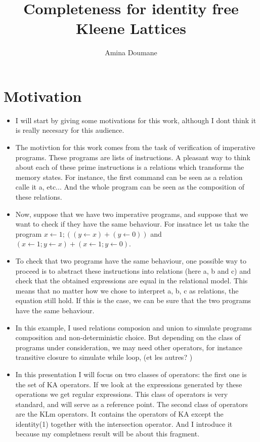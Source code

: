 \documentclass{article}
\title{Completeness for identity free Kleene Lattices }
\author{
  Amina Doumane
}
\begin{document}
\maketitle
\section{Motivation}
\begin{itemize}
\item I will start by giving some motivations for this work, although I dont think it is really necesary for this audience. 
\item  The motivtion for this work comes from the task of verification of imperative programs. These programs are lists of instructions. A pleasant way to think about each of these prime instructions is a relations which transforms the memory states. For instance, the first command can be seen as a relation calle it a, etc... And the whole program can be seen as the composition of these relations.
\item Now, suppose that we have two imperative programs, and suppose that we want to check if they have the same behaviour. For insatnce let us take the program $x \leftarrow 1; ((y \leftarrow x) + (y \leftarrow 0))$ and
$(x \leftarrow 1; y \leftarrow x) + (x \leftarrow 1; y \leftarrow 0)$.

\item To check that two programs have the same behaviour, one possible way to proceed is to abstract these instructions into relations (here a, b and c) and check that the obtained expressions are equal in the relational model. This means that no matter how we chose to interpret a, b, c as relations, the equation still hold. If this is the case, we can be sure that the two programs have the same behaviour.

\item  In this example, I used relations composion and union to simulate programs composition and non-deterministic choice. But depending on the class of programs under consideration, we may need other operators, for instance transitive closure to simulate while loop, (et les autres? ) 

\item In this presentation I will focus on two classes of operators: the first one is the set of KA operators. If we look at the expressions generated by these operations we get regular expressions. This class of operators is very standard, and will serve as a reference point.
The second class of operators are the KLm operators. It contains the operators of KA except the identity(1) together with the intersection operator. And I introduce it because my completness result will be about this fragment.  


\end{itemize}
\end{document}
